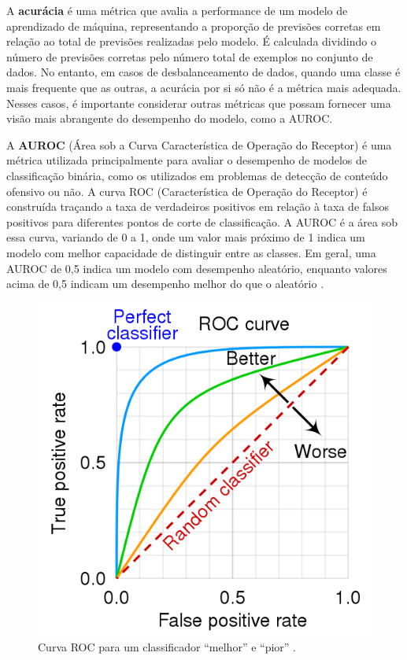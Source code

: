 A \textbf{acurácia} é uma métrica que avalia a performance de um modelo de aprendizado de máquina, representando a proporção de previsões corretas em relação ao total de previsões realizadas pelo modelo. É calculada dividindo o número de previsões corretas pelo número total de exemplos no conjunto de dados. No entanto, em casos de desbalanceamento de dados, quando uma classe é mais frequente que as outras, a acurácia por si só não é a métrica mais adequada. Nesses casos, é importante considerar outras métricas que possam fornecer uma visão mais abrangente do desempenho do modelo, como a AUROC.

A \textbf{AUROC} (Área sob a Curva Característica de Operação do Receptor) é uma métrica utilizada principalmente para avaliar o desempenho de modelos de classificação binária, como os utilizados em problemas de detecção de conteúdo ofensivo ou não. A curva ROC (Característica de Operação do Receptor) é construída traçando a taxa de verdadeiros positivos em relação à taxa de falsos positivos para diferentes pontos de corte de classificação. A AUROC é a área sob essa curva, variando de 0 a 1, onde um valor mais próximo de 1 indica um modelo com melhor capacidade de distinguir entre as classes. Em geral, uma AUROC de 0,5 indica um modelo com desempenho aleatório, enquanto valores acima de 0,5 indicam um desempenho melhor do que o aleatório \cite{BradleyAUROC}.

\begin{figure}[!htbp]
	\centering
	\includegraphics[scale=0.36]{imagens/auroc.png}
    \caption {Curva ROC para um classificador ``melhor'' e ``pior'' \cite{RocCurveWiki}.}
\end{figure}

